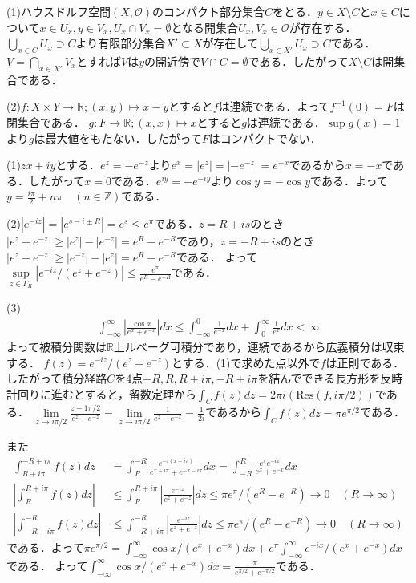 \documentclass[
		book,
		head_space=20mm,
		foot_space=20mm,
		gutter=10mm,
		line_length=190mm
]{jlreq}
\begin{document}
(1)ハウスドルフ空間$(X,\mathcal{O})$のコンパクト部分集合$C$をとる．$y \in X \setminus C$と$x\in C$について$x \in U_x,y\in V_x,U_x \cap V_x=\emptyset$となる開集合$U_x,V_x\in \mathcal{O}$が存在する．$\bigcup\limits_{x\in C }U_x\supset C$より有限部分集合$X' \subset X$が存在して$\bigcup\limits_{x\in X'}U_x\supset C$である．$V=\bigcap\limits_{x\in X'}V_x$とすれば$V$は$y$の開近傍で$V\cap C=\emptyset$である．したがって$X\setminus C$は開集合である．

(2)$f\colon X \times Y \rightarrow \mathbb{R};(x,y)\mapsto x-y$とすると$f$は連続である．よって$f^{-1}(0)=F$は閉集合である．
$g\colon F \rightarrow \mathbb{R};(x,x)\mapsto x$とすると$g$は連続である．$\sup g(x)=1$より$g$は最大値をもたない．したがって$F$はコンパクトでない．

(1)$zx+iy$とする．$e^z=-e^{-z}$より$e^x=|e^z|=|-e^{-z}|=e^{-x}$であるから$x=-x$である．したがって$x=0$である．$e^{iy}=-e^{-iy}$より$\cos y=-\cos y$である．よって$y=\frac{i\pi}{2}+n\pi\quad(n\in \mathbb{Z})$である．

(2)$|e^{-iz}|=|e^{s-i\pm{R}}|=e^s\le e^\pi$である．$z=R+is$のとき$|e^z+e^{-z}|\ge |e^z|-|e^{-z}|=e^R-e^{-R}$であり，$z=-R+is$のとき$|e^z+e^{-z}|\ge |e^{-z}|-|e^{z}|=e^R-e^{-R}$である．
よって$\sup\limits_{z\in \Gamma_R}|e^{-iz}/(e^z+e^{-z})|\le \frac{e^\pi}{e^R-e^{-R}}$である．

(3)\begin{align}
	\int_{-\infty}^\infty\left|  \frac{\cos x}{e^x+e^{-x}} \right|dx \le \int_{-\infty}^0 \frac{1}{e^{-x}}dx+\int_{0}^\infty \frac{1}{e^x}dx<\infty
\end{align}
よって被積分関数は$\mathbb{R}$上ルベーグ可積分であり，連続であるから広義積分は収束する．
$f(z)=e^{-iz}/(e^z+e^{-z})$とする．(1)で求めた点以外で$f$は正則である．したがって積分経路$C$を4点$-R,R,R+i\pi,-R+i\pi$を結んでできる長方形を反時計回りに進むとすると，留数定理から$\int_C f(z)dz=2\pi i(\mathrm{Res}(f,i\pi/2))$である．
$\lim\limits_{z\to i\pi/2}\frac{z-1\pi/2}{e^z+e^{-z}}=\lim\limits_{z\to i\pi/2}\frac{1}{e^z-e^{-z}}=\frac{1}{2i}$であるから$\int_C f(z)dz=\pi e^{\pi/2}$である．

また \begin{align}
	\int_{R+i\pi}^{-R+i\pi}f(z)dz&=\int_{R}^{-R}\frac{e^{-i(x+i\pi)}}{e^{x+i\pi}+e^{-x-i\pi}}dx=\int_{-R}^{R}\frac{e^{\pi}e^{-ix}}{e^{x}+e^{-x}}dx\\
	\left| \int_{R}^{R+i\pi}f(z)dz \right|&\le \int_{R}^{R+i\pi}\left| \frac{e^{-iz}}{e^z+e^{-z}} \right|dz\le \pi e^\pi/(e^R-e^{-R})\rightarrow 0\quad (R\to \infty)\\
	\left| \int_{-R+i\pi}^{-R}f(z)dz \right|&\le \int_{-R+i\pi}^{-R}\left| \frac{e^{-iz}}{e^z+e^{-z}} \right|dz\le \pi e^\pi/(e^R-e^{-R})\rightarrow 0\quad (R\to \infty)
\end{align}である．よって$\pi e^{\pi/2}=\int_{-\infty}^\infty \cos x/(e^{x}+e^{-x})dx+e^{\pi}\int_{-\infty}^\infty e^{-ix}/(e^{x}+e^{-x})dx$である．
よって$\int_{-\infty}^\infty \cos x/(e^{x}+e^{-x})dx=\frac{\pi }{e^{\pi/2}+e^{-\pi/2}}$である．
	
\end{document}

